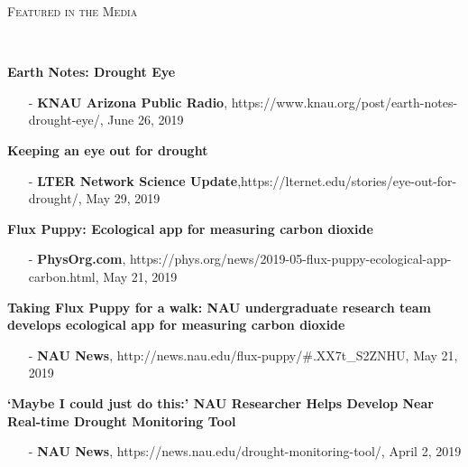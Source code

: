 \documentclass[10pt]{article}
\newenvironment{changemargin}[2]{%
  \begin{list}{}{%
 \setlength{\topsep}{0pt}%
 \setlength{\leftmargin}{#1}%
 \setlength{\rightmargin}{#2}%
 \setlength{\listparindent}{\parindent}%
 \setlength{\itemindent}{\parindent}%
 \setlength{\parsep}{\parskip}%
  }%
  \item[]}{\end{list}
}
\newcommand{\lineover}{
  \begin{changemargin}{-0.05in}{-0.05in}
  \vspace*{-8pt}
  \hrulefill \\
  \vspace*{-2pt}
  \end{changemargin}
}
\newcommand{\header}[1]{
  \begin{changemargin}{-0.5in}{-0.5in}
  \scshape{#1}\\
  \lineover
  \end{changemargin}
}
\newenvironment{body} {
  \vspace*{-2pt}
  \begin{changemargin}{-0.5in}{-0.5in}
}
{\end{changemargin}
}
\begin{document}
\medskip


\header{Featured in the Media}

\begin{body}

  \textbf {Earth Notes: Drought Eye}\\
  \vspace*{-4pt}
  \begin{itemize} \itemsep -0pt
    \item[-]\textbf{KNAU Arizona Public Radio}, https://www.knau.org/post/earth-notes-drought-eye/, \hfill {June 26, 2019}\\
  \end{itemize} 

  \textbf {Keeping an eye out for drought}\\
  \vspace*{-4pt}
  \begin{itemize} \itemsep -0pt
    \item[-]\textbf{LTER Network Science Update},https://lternet.edu/stories/eye-out-for-drought/, \hfill{May 29, 2019}\\
  \end{itemize} 

  \textbf {Flux Puppy: Ecological app for measuring carbon dioxide}\\
  \vspace*{-4pt}
  \begin{itemize} \itemsep -0pt
    \item[-]\textbf{PhysOrg.com}, https://phys.org/news/2019-05-flux-puppy-ecological-app-carbon.html, \hfill {May 21, 2019}\\
  \end{itemize} 

  \textbf {Taking Flux Puppy for a walk: NAU undergraduate research team develops ecological app for measuring carbon dioxide}\\
  \vspace*{-4pt}
  \begin{itemize} \itemsep -0pt
    \item[-]\textbf{NAU News}, http://news.nau.edu/flux-puppy/\#.XX7t\_S2ZNHU, \hfill {May 21, 2019}\\
  \end{itemize} 

  \textbf {‘Maybe I could just do this:’ NAU Researcher Helps Develop Near Real-time Drought Monitoring Tool}\\
  \vspace*{-4pt}
  \begin{itemize} \itemsep -0pt
    \item[-]  \textbf{NAU News}, https://news.nau.edu/drought-monitoring-tool/, \hfill{April 2, 2019}\\
  \end{itemize} 


\end{body}
\end{document}
